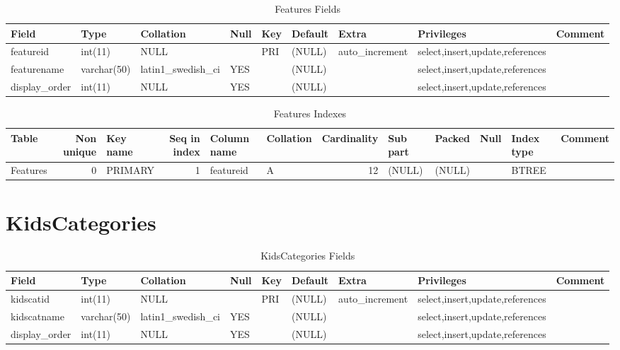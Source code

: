 \documentclass[captions=tablesignature]{scrartcl}
\begin{document}
\begin{table}[htb]
\caption{\label{tbl:featuresfields}Features Fields}
\centering
\begin{tabular}{lllllllll}
\hline
Field & Type & Collation & Null & Key & Default & Extra & Privileges & Comment\\
\hline
featureid & int(11) & NULL &  & PRI & (NULL) & auto\_increment & select,insert,update,references & \\
featurename & varchar(50) & latin1\_swedish\_ci & YES &  & (NULL) &  & select,insert,update,references & \\
display\_order & int(11) & NULL & YES &  & (NULL) &  & select,insert,update,references & \\
\hline
\end{tabular}
\end{table}

\begin{table}[htb]
\caption{\label{tbl:featuresindexes}Features Indexes}
\centering
\begin{tabular}{lrlrllrlllll}
\hline
Table & Non unique & Key name & Seq in index & Column name & Collation & Cardinality & Sub part & Packed & Null & Index type & Comment\\
\hline
Features & 0 & PRIMARY & 1 & featureid & A & 12 & (NULL) & (NULL) &  & BTREE & \\
\hline
\end{tabular}
\end{table}
\section{KidsCategories}
\label{sec-4}

\begin{table}[htb]
\caption{\label{tbl:kidscategoriesfields}KidsCategories Fields}
\centering
\begin{tabular}{lllllllll}
\hline
Field & Type & Collation & Null & Key & Default & Extra & Privileges & Comment\\
\hline
kidscatid & int(11) & NULL &  & PRI & (NULL) & auto\_increment & select,insert,update,references & \\
kidscatname & varchar(50) & latin1\_swedish\_ci & YES &  & (NULL) &  & select,insert,update,references & \\
display\_order & int(11) & NULL & YES &  & (NULL) &  & select,insert,update,references & \\
\hline
\end{tabular}
\end{table}
\end{document}

